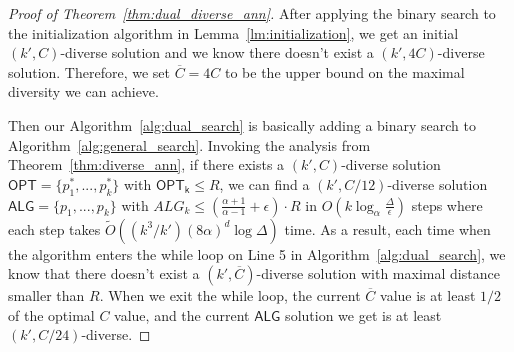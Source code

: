 \begin{proof}[Proof of Theorem~\ref{thm:dual_diverse_ann}]

After applying the binary search to the initialization algorithm in Lemma~\ref{lm:initialization}, we get an initial $(k',C)$-diverse solution and we know there doesn't exist a $(k',4C)$-diverse solution. Therefore, we set $\overline{C}=4C$ to be the upper bound on the maximal diversity we can achieve.


Then our Algorithm~\ref{alg:dual_search} is basically adding a binary search to Algorithm~\ref{alg:general_search}. Invoking the analysis from Theorem~\ref{thm:diverse_ann}, if there exists a $(k',C)$-diverse solution $\mathsf{OPT}=\{p^*_1,...,p^*_k\}$ with $\mathsf{OPT_k}\le R$, we can find a $(k',C/12)$-diverse solution $\mathsf{ALG}=\{p_1,...,p_k\}$ with $ALG_k\le \left(\frac{\alpha+1}{\alpha-1}+\epsilon\right)\cdot R$ in $O(k\log_{\alpha}\frac{\Delta}{\epsilon})$ steps where each step takes $\tilde{O}((k^3/k')(8\alpha)^d\log\Delta)$ time. As a result, each time when the algorithm enters the while loop on Line 5 in Algorithm~\ref{alg:dual_search}, we know that there doesn't exist a $(k',\overline{C})$-diverse solution with maximal distance smaller than $R$. When we exit the while loop, the current $\overline{C}$ value is at least $1/2$ of the optimal $C$ value, and the current $\mathsf{ALG}$ solution we get is at least $(k',C/24)$-diverse.
\end{proof}